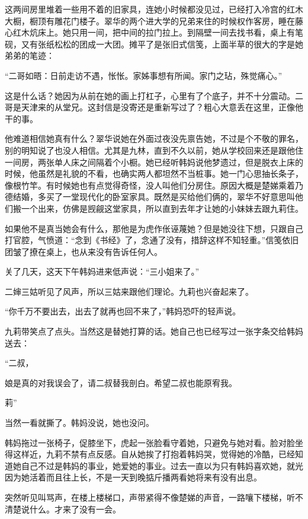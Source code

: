 \par 这两间房里堆着一些用不着的旧家具，连她小时候都没见过，已经打入冷宫的红木大橱，橱顶有雕花门楼子。翠华的两个进大学的兄弟来住的时候权作客房，睡在藤心红木炕床上。她只用一间，把中间的拉门拉上。到隔壁一间去找书看，桌上有笔砚，又有张纸松松的团成一大团。摊平了是张旧式信笺，上面半草的很大的字是她弟弟的笔迹：
\par “二哥如晤：日前走访不遇，怅怅。家姊事想有所闻。家门之玷，殊觉痛心。”
\par 这是什么话？她因为从前在她的画上打杠子，心里有了个底子，并不十分震动。二哥是天津来的从堂兄。这封信是没寄还是重新写过了？粗心大意丢在这里，正像他干的事。
\par 他难道相信她真有什么？翠华说她在外面过夜没先禀告她，不过是个不敬的罪名，别的明知说了也没人相信。尤其是九林，直到不久以前，她从学校回来还是跟他住一间房，两张单人床之间隔着个小橱。她已经听韩妈说他梦遗过，但是脱衣上床的时候，他虽然是礼貌的不看，也确实两人都坦然不当桩事。她一门心思抽长条子，像根竹竿。有时候她也有点觉得奇怪，没人叫他们分房住。原因大概是楚娣乘着乃德结婚，多买了一堂现代化的卧室家具。既然是买给他们俩的，翠华不好意思叫他们搬一个出来，仿佛是觊觎这堂家具，所以直到去年才让她的小妹妹去跟九莉住。
\par 如果他不是真当她会有什么，那他是为虎作伥诬蔑她？但是她没往下想，只跟自己打官腔，气愤道：“念到《书经》了，念通了没有，措辞这样不知轻重。”信笺依旧团皱了撩在桌上，也从来没有告诉任何人。
\par 关了几天，这天下午韩妈进来低声说：“三小姐来了。”
\par 二婶三姑听见了风声，所以三姑来跟他们理论。九莉也兴奋起来了。
\par “你千万不要出去，出去了就再也回不来了，”韩妈恐吓的轻声说。
\par 九莉带笑点了点头。当然这是替她打算的话。她自己也已经写过一张字条交给韩妈送去：
\par “二叔，
\par 娘是真的对我误会了，请二叔替我剖白。希望二叔也能原宥我。
\par 莉”
\par 当然一看就撕了。韩妈没说，她也没问。
\par 韩妈拖过一张椅子，促膝坐下，虎起一张脸看守着她，只避免与她对看。脸对脸坐得这样近，九莉不禁有点反感。自从她挨了打抱着韩妈哭，觉得她的冷酷，已经知道她自己不过是韩妈的事业，她爱她的事业。过去一直以为只有韩妈喜欢她，就光因为她活着而且往上长，不是一天到晚掂斤播两看她将来有没有出息。
\par 突然听见叫骂声，在楼上楼梯口，声带紧得不像楚娣的声音，一路嚷下楼梯，听不清楚说什么。才来了没有一会。
